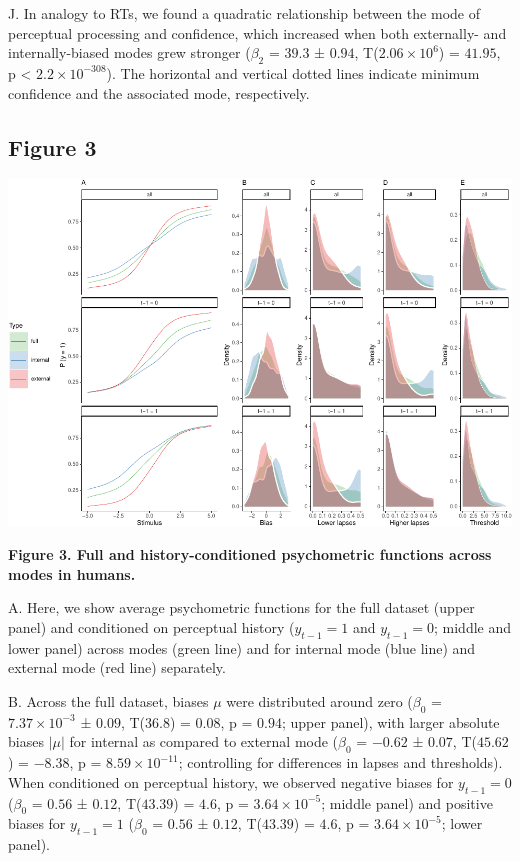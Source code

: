 \documentclass[
]{article}
\begin{document}
J. In analogy to RTs, we found a quadratic relationship between the mode
of perceptual processing and confidence, which increased when both
externally- and internally-biased modes grew stronger (\(\beta_2\) =
\(39.3\) ± \(0.94\), T(\(\ensuremath{2.06\times 10^{6}}\)) = \(41.95\),
p < \(\ensuremath{2.2\times 10^{-308}}\)). The horizontal and vertical dotted lines indicate minimum
confidence and the associated mode, respectively.

\newpage

\hypertarget{figure-3}{%
\subsection{Figure 3}\label{figure-3}}

\includegraphics{modes_mouse_files/figure-latex/Figure_3-1.pdf}

\textbf{Figure 3. Full and history-conditioned psychometric functions
across modes in humans.}

A. Here, we show average psychometric functions for the full dataset
(upper panel) and conditioned on perceptual history (\(y_{t-1} = 1\) and
\(y_{t-1} = 0\); middle and lower panel) across modes (green line) and
for internal mode (blue line) and external mode (red line) separately.

B. Across the full dataset, biases \(\mu\) were distributed around zero
(\(\beta_0\) = \(\ensuremath{7.37\times 10^{-3}}\) ± \(0.09\),
T(\(36.8\)) = \(0.08\), p = \(0.94\); upper panel), with larger absolute
biases \(|\mu|\) for internal as compared to external mode (\(\beta_0\)
= \(-0.62\) ± \(0.07\), T(\(45.62\)) = \(-8.38\), p =
\(\ensuremath{8.59\times 10^{-11}}\); controlling for differences in
lapses and thresholds). When conditioned on perceptual history, we
observed negative biases for \(y_{t-1} = 0\) (\(\beta_0\) = \(0.56\) ±
\(0.12\), T(\(43.39\)) = \(4.6\), p =
\(\ensuremath{3.64\times 10^{-5}}\); middle panel) and positive biases
for \(y_{t-1} = 1\) (\(\beta_0\) = \(0.56\) ± \(0.12\), T(\(43.39\)) =
\(4.6\), p = \(\ensuremath{3.64\times 10^{-5}}\); lower panel).
\end{document}
